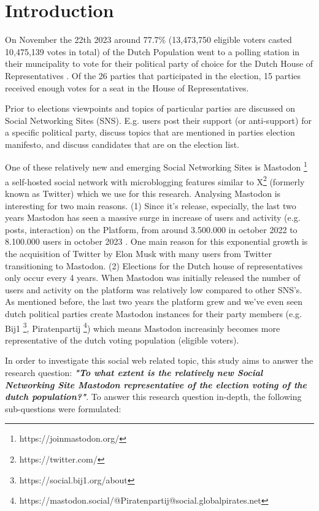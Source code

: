 \section{Introduction}

On November the 22th 2023 around 77.7\% (13,473,750 eligible voters casted 10,475,139 votes in total) of the Dutch Population went to a polling station in their muncipality to vote for their political party of choice for the Dutch House of Representatives \cite{kies}. Of the 26 parties that participated in the election, 15 parties received enough votes for a seat in the House of Representatives.

Prior to elections viewpoints and topics of particular parties are discussed on Social Networking Sites (SNS). E.g. users post their support (or anti-support) for a specific political party, discuss topics that are mentioned in parties election manifesto, and discuss candidates that are on the election list.

One of these relatively new and emerging Social Networking Sites is Mastodon \footnote{https://joinmastodon.org/} a self-hosted social network with microblogging features similar to X\footnote{https://twitter.com/} (formerly known as Twitter) which we use for this research. Analysing Mastodon is interesting for two main reasons. (1) Since it's release, especially, the last two years Mastodon has seen a massive surge in increase of users and activity (e.g. posts, interaction) on the Platform, from around 3.500.000 in october 2022 to 8.100.000 users in october 2023 \cite{analytics}. One main reason for this exponential growth is the acquisition of Twitter by Elon Musk \cite{musk} with many users from Twitter transitioning to Mastodon. (2) Elections for the Dutch house of representatives only occur every 4 years. When Mastodon was initially released the number of users and activity on the platform was relatively low compared to other SNS's. As mentioned before, the last two years the platform grew and we've even seen dutch political parties create Mastodon instances for their party members (e.g. Bij1 \footnote{https://social.bij1.org/about}, Piratenpartij \footnote{https://mastodon.social/@Piratenpartij@social.globalpirates.net}) which means Mastodon increasinly becomes more representative of the dutch voting population (eligible voters).

In order to investigate this social web related topic, this study aims to answer the research question:
\textbf{\textit{"To what extent is the relatively new Social Networking Site Mastodon representative of the election voting of the dutch population?"}}. To answer this research question in-depth, the following sub-questions were formulated:

